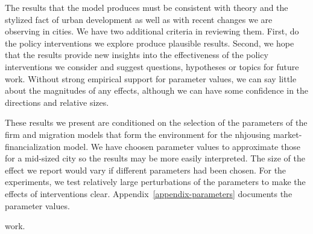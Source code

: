 The results that the model produces  must be consistent with theory and the stylized fact of urban development as well as with recent changes we are observing in cities. We have two additional criteria in reviewing them. First, do the policy interventions we explore produce plausible results. Second, we hope that the results provide new insights into the effectiveness of the policy interventions we consider and suggest questions, hypotheses or topics for future work.  Without strong empirical support for parameter values, we can say little about the magnitudes of any effects, although we can have some confidence in the directions and relative sizes. 



These results we present are conditioned on the selection of the parameters of the firm and migration models that form the environment for the nhjousing market-financialization model. We have choosen parameter values to approximate those for a mid-sized city so the results may be more easily interpreted.  The size of the effect we report would vary if different parameters had been chosen. %
For the experiments, we test relatively large perturbations of the parameters to make the effects of interventions clear. Appendix~\ref{appendix-parameters} documents the parameter values.



%

work. %






